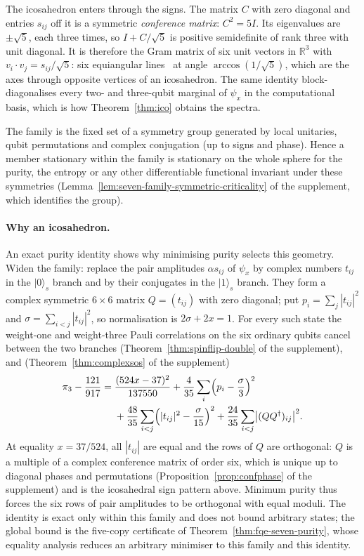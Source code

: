 The icosahedron enters through the signs. The matrix $C$ with zero diagonal and entries $s_{ij}$ off it is a symmetric
\emph{conference matrix}: $C^2=5I$. Its eigenvalues are $\pm\sqrt5$, each three times, so $I+C/\sqrt5$ is positive
semidefinite of rank three with unit diagonal. It is therefore the Gram matrix of six unit vectors in $\mathbb R^3$ with
$v_i\cdot v_j=s_{ij}/\sqrt5$: six equiangular lines~\cite{LS} at angle $\arccos(1/\sqrt5)$, which are the axes through opposite
vertices of an icosahedron. The same identity block-diagonalises every two- and three-qubit marginal of $\psi_x$ in
the computational basis, which is how Theorem~\ref{thm:ico} obtains the spectra.

The family is the fixed set of a symmetry group generated by local unitaries, qubit permutations and complex
conjugation (up to signs and phase). Hence a member stationary within the family is stationary on the whole sphere for
the purity, the entropy or any other differentiable functional invariant under these symmetries
(Lemma~\ref{lem:seven-family-symmetric-criticality} of the supplement, which identifies the group).

\paragraph{Why an icosahedron.} An exact purity identity shows why minimising purity selects this geometry. Widen the
family: replace the pair amplitudes $\alpha s_{ij}$ of $\psi_x$ by complex numbers $t_{ij}$ in the $|0\rangle_s$ branch
and by their conjugates in the $|1\rangle_s$ branch. They form a complex symmetric $6\times6$ matrix $Q=(t_{ij})$ with
zero diagonal; put $p_i=\sum_j|t_{ij}|^2$ and $\sigma=\sum_{i<j}|t_{ij}|^2$, so normalisation is $2\sigma+2x=1$. For every
such state the weight-one and weight-three Pauli correlations on the six ordinary qubits cancel between the two branches
(Theorem~\ref{thm:spinflip-double} of the supplement), and (Theorem~\ref{thm:complexsos} of the supplement)
\begin{equation}\label{eq:fqe-complex-sos}
\begin{aligned}
 \pi_3-\frac{121}{917}={}&\frac{(524x-37)^2}{137550}+\frac4{35}\sum_i\Bigl(p_i-\frac\sigma3\Bigr)^2\\
 &+\frac{48}{35}\sum_{i<j}\Bigl(|t_{ij}|^2-\frac\sigma{15}\Bigr)^2+\frac{24}{35}\sum_{i<j}\bigl|(QQ^\dagger)_{ij}\bigr|^2.
\end{aligned}
\end{equation}
At equality $x=37/524$, all $|t_{ij}|$ are equal and the rows of $Q$ are orthogonal: $Q$ is a multiple of a complex
conference matrix of order six, which is unique up to diagonal phases and permutations
(Proposition~\ref{prop:confphase} of the supplement) and is the icosahedral sign pattern above. Minimum purity thus
forces the six rows of pair amplitudes to be orthogonal with equal moduli. The identity is exact only within this
family and does not bound arbitrary states; the global bound is the five-copy certificate of
Theorem~\ref{thm:fqe-seven-purity}, whose equality analysis reduces an arbitrary minimiser to this family and this identity.


